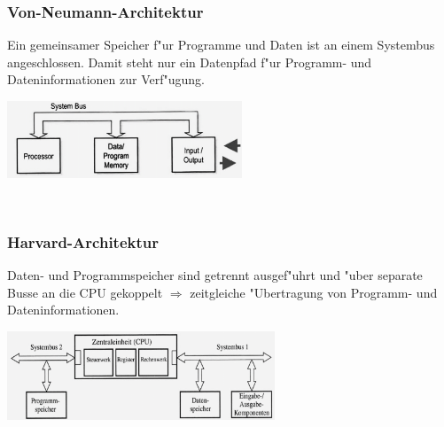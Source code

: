 \begin{minipage}{9cm}
	\subsubsection{Von-Neumann-Architektur}
Ein gemeinsamer Speicher f"ur Programme und Daten ist an einem Systembus angeschlossen. Damit steht nur ein Datenpfad f"ur Programm- und Dateninformationen zur Verf"ugung.

\includegraphics[width = 7cm]{pics/Von-Neumann-Architektur}
\end{minipage}
%
\begin{minipage}{0.5cm}
	\ \
\end{minipage}
%
\begin{minipage}{9cm}
	\subsubsection{Harvard-Architektur}
	Daten- und Programmspeicher sind getrennt ausgef"uhrt und "uber separate Busse an die CPU gekoppelt $\Rightarrow$ zeitgleiche "Ubertragung von Programm- und Dateninformationen.
	
\includegraphics[width = 8cm]{pics/Harvard-Architektur}
\end{minipage}

